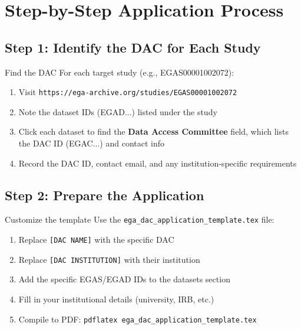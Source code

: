 \documentclass[11pt,letterpaper]{article}
\begin{document}
\section{Step-by-Step Application Process}

\subsection{Step 1: Identify the DAC for Each Study}

\begin{actionbox}{Find the DAC}
For each target study (e.g., EGAS00001002072):
\begin{enumerate}[nosep]
    \item Visit \texttt{https://ega-archive.org/studies/EGAS00001002072}
    \item Note the dataset IDs (EGAD...) listed under the study
    \item Click each dataset to find the \textbf{Data Access Committee}
          field, which lists the DAC ID (EGAC...) and contact info
    \item Record the DAC ID, contact email, and any institution-specific
          requirements
\end{enumerate}
\end{actionbox}

\subsection{Step 2: Prepare the Application}

\begin{actionbox}{Customize the template}
Use the \texttt{ega\_dac\_application\_template.tex} file:
\begin{enumerate}[nosep]
    \item Replace \texttt{[DAC NAME]} with the specific DAC
    \item Replace \texttt{[DAC INSTITUTION]} with their institution
    \item Add the specific EGAS/EGAD IDs to the datasets section
    \item Fill in your institutional details (university, IRB, etc.)
    \item Compile to PDF: \texttt{pdflatex ega\_dac\_application\_template.tex}
\end{enumerate}
\end{actionbox}
\end{document}
